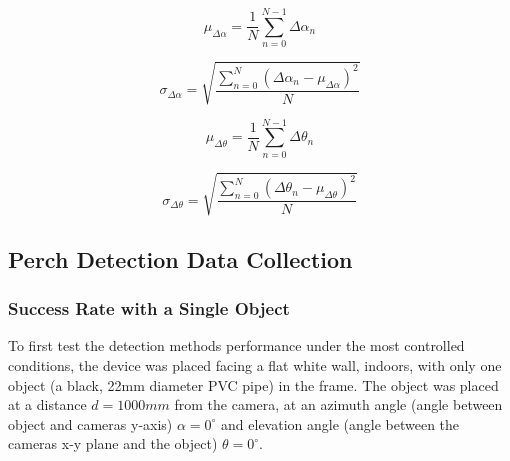 \begin{minipage}{\linewidth}
    \begin{equation}
        \mu_{\Delta \alpha} = \frac{1}{N} \sum_{n=0}^{N-1} \Delta \alpha_n
        \label{eqn:m_da}
    \end{equation}
\end{minipage}

\begin{minipage}{\linewidth}
    \begin{equation}
        \sigma_{\Delta \alpha} = \sqrt{\frac{\sum_{n=0}^{N} (\Delta \alpha_n - \mu_{\Delta \alpha})^2 }{N}}
        \label{eqn:s_da}
    \end{equation}
\end{minipage}

\begin{minipage}{\linewidth}
    \begin{equation}
        \mu_{\Delta \theta} = \frac{1}{N} \sum_{n=0}^{N-1} \Delta \theta_n
        \label{eqn:m_dt}
    \end{equation}
\end{minipage}

\begin{minipage}{\linewidth}
    \begin{equation}
        \sigma_{\Delta \theta} = \sqrt{\frac{\sum_{n=0}^{N} (\Delta \theta_n - \mu_{\Delta \theta})^2 }{N}}
        \label{eqn:s_dt}
    \end{equation}
\end{minipage}


\subsection{Perch Detection Data Collection}

\subsubsection{Success Rate with a Single Object} \label{sec:methods:collection-single}
To first test the detection methods performance under the most controlled conditions, the device was placed facing a flat white wall, indoors,
with only one object (a black, 22mm diameter PVC pipe) in the frame. The object was placed at a distance $d = 1000mm$ from the camera, at an azimuth angle (angle between
object and cameras y-axis) $\alpha = 0^\circ$ and elevation angle (angle between the cameras x-y plane and the object) $\theta = 0^\circ$.

